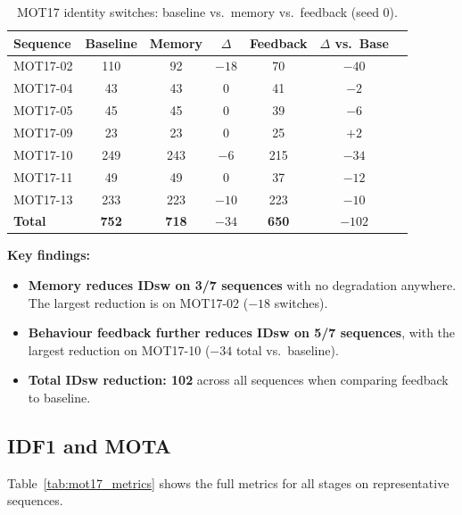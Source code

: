 \documentclass[11pt,a4paper]{article}
\begin{document}
\begin{table}[H]
\centering
\caption{MOT17 identity switches: baseline vs.\ memory vs.\ feedback (seed 0).}
\label{tab:mot17_idsw}
\begin{tabular}{@{}lcccccc@{}}
\toprule
\textbf{Sequence} & \textbf{Baseline} & \textbf{Memory} & $\Delta$ & \textbf{Feedback} & $\Delta$ vs.\ Base \\
\midrule
MOT17-02 & 110 & 92 & $-18$ & 70 & $-40$ \\
MOT17-04 & 43 & 43 & $0$ & 41 & $-2$ \\
MOT17-05 & 45 & 45 & $0$ & 39 & $-6$ \\
MOT17-09 & 23 & 23 & $0$ & 25 & $+2$ \\
MOT17-10 & 249 & 243 & $-6$ & 215 & $-34$ \\
MOT17-11 & 49 & 49 & $0$ & 37 & $-12$ \\
MOT17-13 & 233 & 223 & $-10$ & 223 & $-10$ \\
\midrule
\textbf{Total} & \textbf{752} & \textbf{718} & \textbf{$-34$} & \textbf{650} & \textbf{$-102$} \\
\bottomrule
\end{tabular}
\end{table}

\textbf{Key findings:}
\begin{itemize}[leftmargin=2em]
    \item \textbf{Memory reduces IDsw on 3/7 sequences} with no degradation anywhere. The largest reduction is on MOT17-02 ($-18$ switches).
    \item \textbf{Behaviour feedback further reduces IDsw on 5/7 sequences}, with the largest reduction on MOT17-10 ($-34$ total vs.\ baseline).
    \item \textbf{Total IDsw reduction: 102} across all sequences when comparing feedback to baseline.
\end{itemize}

\subsection{IDF1 and MOTA}
Table~\ref{tab:mot17_metrics} shows the full metrics for all stages on representative sequences.
\end{document}
